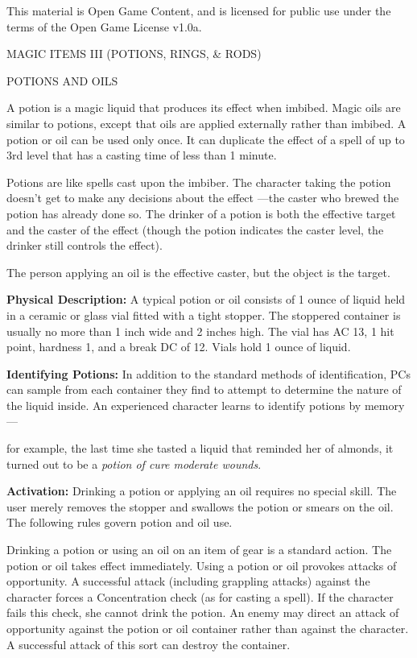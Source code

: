 \documentclass{article}
\begin{document}
This material is Open Game Content, and is licensed for public use under the terms 
of the Open Game License v1.0a.

{\LARGE{}MAGIC ITEMS III (POTIONS, RINGS, \& RODS)}

\vspace{12pt}
POTIONS AND OILS

A potion is a magic liquid that produces its effect when imbibed. Magic oils are 
similar to potions, except that oils are applied externally rather than imbibed. 
A potion or oil can be used only once. It can duplicate the effect of a spell of 
up to 3rd level that has a casting time of less than 1 minute.

Potions are like spells cast upon the imbiber. The character taking the potion 
doesn't get to make any decisions about the effect ---the caster who brewed the 
potion has already done so. The drinker of a potion is both the effective target 
and the caster of the effect (though the potion indicates the caster level, the 
drinker still controls the effect).

The person applying an oil is the effective caster, but the object is the target.

\textbf{Physical Description:} A typical potion or oil consists of 1 ounce of liquid 
held in a ceramic or glass vial fitted with a tight stopper. The stoppered container 
is usually no more than 1 inch wide and 2 inches high. The vial has AC 13, 1 hit 
point, hardness 1, and a break DC of 12. Vials hold 1 ounce of liquid.

\textbf{Identifying Potions:} In addition to the standard methods of identification, 
PCs can sample from each container they find to attempt to determine the nature 
of the liquid inside. An experienced character learns to identify potions by memory---

for example, the last time she tasted a liquid that reminded her of almonds, it 
turned out to be a \textit{potion of cure moderate wounds}. 

\textbf{Activation:} Drinking a potion or applying an oil requires no special skill. 
The user merely removes the stopper and swallows the potion or smears on the oil. 
The following rules govern potion and oil use.

Drinking a potion or using an oil on an item of gear is a standard action. The 
potion or oil takes effect immediately. Using a potion or oil provokes attacks 
of opportunity. A successful attack (including grappling attacks) against the character 
forces a Concentration check (as for casting a spell). If the character fails this 
check, she cannot drink the potion. An enemy may direct an attack of opportunity 
against the potion or oil container rather than against the character. A successful 
attack of this sort can destroy the container. 
\end{document}
